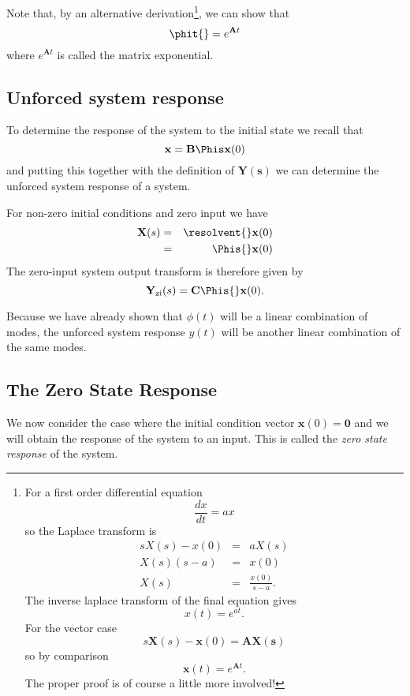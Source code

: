 Note that, by an alternative derivation\footnote{%
For a first order differential equation \[\frac{dx}{dt}=ax\] so
the Laplace transform is \begin{eqnarray*}sX(s) - x(0) & = &
aX(s)\\ X(s)(s - a)& = & x(0)\\ X(s)
&=&\frac{x(0)}{s-a}.\end{eqnarray*} The inverse laplace transform
of the final equation gives \[x(t) = e^{at}.\] For the vector case
\[s\mathbf{X}(s)-\mathbf{x}(0)=\mathbf{A}\mathbf{X(s)}\] so by comparison
\[\mathbf{x}(t)=e^{\mathbf{A} t}.\] The proper proof is of course
a little more involved!}, we can show that
\[\phit{}=e^{\mathbf{A}t}\] where $e^{\mathbf{A}t}$ is called the matrix exponential.

\subsection*{Unforced system response}
To determine the response of the system to the initial state we recall that
\[\mathbf{x} = \mathbf{B}\mathbf{\Phis} \mathbf{x}(0)\]
 and putting this together with the definition of $\mathbf{Y(s)}$ we can
 determine the unforced system response of a system.

\begin{slide} \label{slide:l4s11a}
For non-zero initial conditions and zero input we have
\begin{eqnarray}\label{eq:l4eq6a}
  \mathbf{X}(s)&=&\resolvent{}\mathbf{x}(0) \\
&=& \Phis{}\mathbf{x}(0) \label{eq:l4eq7a}
\end{eqnarray}
The zero-input system output transform is therefore given by
\begin{equation}\label{eq:l4eq8a}
 \mathbf{Y}_\mathrm{zi}(s)=\mathbf{C}\Phis{}\mathbf{x}(0).
\end{equation}
\end{slide}
Because we have already shown that $\phi(t)$ will be a linear combination of modes,
the unforced system response $y(t)$ will be another linear combination of the same modes.

\subsection*{The Zero State Response}
We now consider the case where the initial condition vector
$\mathbf{x}(0)=\mathbf{0}$ and we will obtain the response of the
system to an input. This is called the \emph{zero state response}
of the system.

